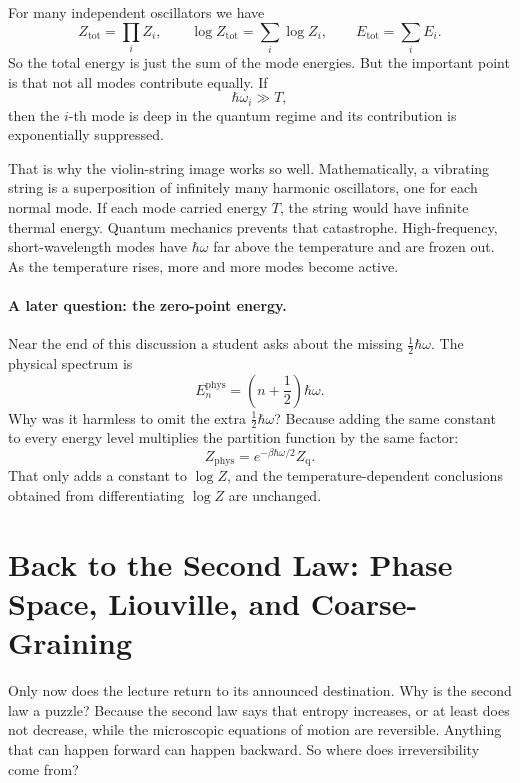 For many independent oscillators we have
\begin{equation}
Z_{\mathrm{tot}}=\prod_i Z_i,
\qquad
\log Z_{\mathrm{tot}}=\sum_i \log Z_i,
\qquad
E_{\mathrm{tot}}=\sum_i E_i.
\end{equation}
So the total energy is just the sum of the mode energies. But the important point is that not all modes contribute equally. If
\begin{equation}
\hbar\omega_i\gg T,
\end{equation}
then the \(i\)-th mode is deep in the quantum regime and its contribution is exponentially suppressed.

That is why the violin-string image works so well. Mathematically, a vibrating string is a superposition of infinitely many harmonic oscillators, one for each normal mode. If each mode carried energy \(T\), the string would have infinite thermal energy. Quantum mechanics prevents that catastrophe. High-frequency, short-wavelength modes have \(\hbar\omega\) far above the temperature and are frozen out. As the temperature rises, more and more modes become active.

\paragraph{A later question: the zero-point energy.} Near the end of this discussion a student asks about the missing \(\frac12\hbar\omega\). The physical spectrum is
\begin{equation}
E_n^{\mathrm{phys}}=\left(n+\frac12\right)\hbar\omega.
\end{equation}
Why was it harmless to omit the extra \(\frac12\hbar\omega\)? Because adding the same constant to every energy level multiplies the partition function by the same factor:
\begin{equation}
Z_{\mathrm{phys}}=e^{-\beta\hbar\omega/2}Z_{\mathrm{q}}.
\end{equation}
That only adds a constant to \(\log Z\), and the temperature-dependent conclusions obtained from differentiating \(\log Z\) are unchanged.

\section{Back to the Second Law: Phase Space, Liouville, and Coarse-Graining}

Only now does the lecture return to its announced destination. Why is the second law a puzzle? Because the second law says that entropy increases, or at least does not decrease, while the microscopic equations of motion are reversible. Anything that can happen forward can happen backward. So where does irreversibility come from?

